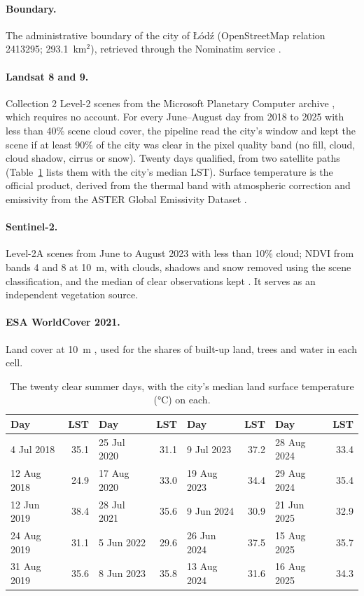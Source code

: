 \documentclass[11pt,a4paper]{article}
\begin{document}
\paragraph{Boundary.} The administrative boundary of the city of Łódź (OpenStreetMap relation 2413295; 293.1~km$^2$), retrieved through the Nominatim service \cite{osm}.

\paragraph{Landsat 8 and 9.} Collection 2 Level-2 scenes from the Microsoft Planetary Computer archive \cite{planetary}, which requires no account. For every June–August day from 2018 to 2025 with less than 40\% scene cloud cover, the pipeline read the city's window and kept the scene if at least 90\% of the city was clear in the pixel quality band (no fill, cloud, cloud shadow, cirrus or snow). Twenty days qualified, from two satellite paths (Table~\ref{tab:dates} lists them with the city's median LST). Surface temperature is the official product, derived from the thermal band with atmospheric correction and emissivity from the ASTER Global Emissivity Dataset \cite{malakar2018,hulley2015}.

\paragraph{Sentinel-2.} Level-2A scenes from June to August 2023 with less than 10\% cloud; NDVI from bands 4 and 8 at 10~m, with clouds, shadows and snow removed using the scene classification, and the median of clear observations kept \cite{drusch2012}. It serves as an independent vegetation source.

\paragraph{ESA WorldCover 2021.} Land cover at 10~m \cite{zanaga2022}, used for the shares of built-up land, trees and water in each cell.

\begin{table}[htbp]
\centering
\small
\caption{The twenty clear summer days, with the city's median land surface temperature (°C) on each.}
\label{tab:dates}
\setlength{\tabcolsep}{5pt}
\begin{tabular}{lrlrlrlr}
\toprule
Day & LST & Day & LST & Day & LST & Day & LST \\
\midrule
4 Jul 2018 & 35.1 & 25 Jul 2020 & 31.1 & 9 Jul 2023 & 37.2 & 28 Aug 2024 & 33.4 \\
12 Aug 2018 & 24.9 & 17 Aug 2020 & 33.0 & 19 Aug 2023 & 34.4 & 29 Aug 2024 & 35.4 \\
12 Jun 2019 & 38.4 & 28 Jul 2021 & 35.6 & 9 Jun 2024 & 30.9 & 21 Jun 2025 & 32.9 \\
24 Aug 2019 & 31.1 & 5 Jun 2022 & 29.6 & 26 Jun 2024 & 37.5 & 15 Aug 2025 & 35.7 \\
31 Aug 2019 & 35.6 & 8 Jun 2023 & 35.8 & 13 Aug 2024 & 31.6 & 16 Aug 2025 & 34.3 \\
\bottomrule
\end{tabular}
\end{table}
\end{document}

